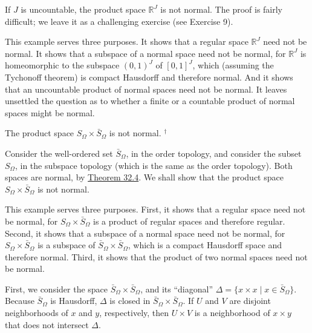 \begin{centeredblock}
\begin{example}
\label{ex:\thesection.\theexample}
 If \(J\) is uncountable, the product space \(\mathbb{R}^{J}\) is not normal. The proof is fairly difficult; we leave it as a challenging exercise (see Exercise 9).

This example serves three purposes. It shows that a regular space \(\mathbb{R}^{J}\) need not be normal. It shows that a subspace of a normal space need not be normal, for \(\mathbb{R}^{J}\) is homeomorphic to the subspace \({( 0,1) }^{J}\) of \({[ 0,1] }^{J}\), which (assuming the Tychonoff theorem) is compact Hausdorff and therefore normal. And it shows that an uncountable product of normal spaces need not be normal. It leaves unsettled the question as to whether a finite or a countable product of normal spaces might be normal.
\end{example}
\end{centeredblock}

\begin{centeredblock}
\begin{example}
\label{ex:\thesection.\theexample}
 The product space \( S_{\Omega } \times {\bar{S}}_{\Omega }\) is not normal. ${}^{\dagger}$

Consider the well-ordered set \(\bar{S}_{\Omega }\), in the order topology, and consider the subset \(S_{\Omega }\), in the subspace topology (which is the same as the order topology). Both spaces are normal, by \hyperref[thm:32.4]{Theorem 32.4}. We shall show that the product space \(S_{\Omega } \times {\bar{S}}_{\Omega }\) is not normal.

This example serves three purposes. First, it shows that a regular space need not be normal, for \(S_{\Omega } \times {\bar{S}}_{\Omega }\) is a product of regular spaces and therefore regular. Second, it shows that a subspace of a normal space need not be normal, for \(S_{\Omega } \times {\bar{S}}_{\Omega }\) is a subspace of \(\bar{S}_{\Omega } \times {\bar{S}}_{\Omega }\), which is a compact Hausdorff space and therefore normal. Third, it shows that the product of two normal spaces need not be normal.
\end{example}
\end{centeredblock}

First, we consider the space \(\bar{S}_{\Omega } \times {\bar{S}}_{\Omega }\), and its ``diagonal'' \(\Delta = \{ {x \times x \mid x \in {\bar{S}}_{\Omega }}\}\). Because \(\bar{S}_{\Omega }\) is Hausdorff, \(\Delta\) is closed in \(\bar{S}_{\Omega } \times {\bar{S}}_{\Omega }\). If \(U\) and \(V\) are disjoint neighborhoods of \(x\) and \(y\), respectively, then \(U \times V\) is a neighborhood of \(x \times y\) that does not intersect \(\Delta\).

